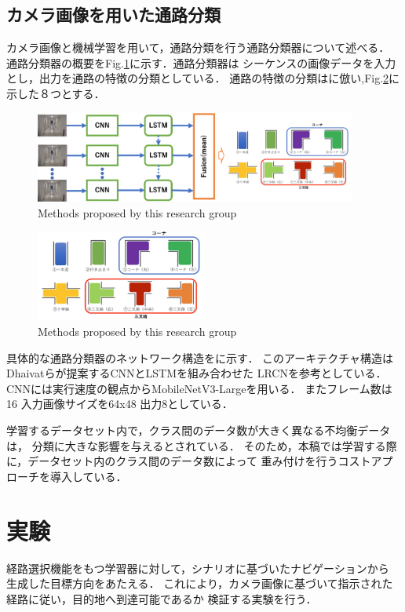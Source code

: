 \documentclass{sice-si}
\begin{document}
\subsection{カメラ画像を用いた通路分類}
カメラ画像と機械学習を用いて，通路分類を行う通路分類器について述べる．
通路分類器の概要をFig.\ref{fig:lrcn}に示す．通路分類器は
シーケンスの画像データを入力とし，出力を通路の特徴の分類としている．
通路の特徴の分類は\cite{shimada2020}に倣い,Fig.\ref{fig:intersection}に示した８つとする．
\begin{figure}[h!]
    \centering
     \includegraphics[height=30mm]{./figs/LRCN.png}
     \caption{Methods proposed by this research group}\label{fig:lrcn}
\end{figure}
\begin{figure}[h!]
    \centering
     \includegraphics[height=30mm]{./figs/intersection.png}
     \caption{Methods proposed by this research group}\label{fig:intersection}
\end{figure}
\par
具体的な通路分類器のネットワーク構造をに示す．
このアーキテクチャ構造はDhaivatらが提案するCNNとLSTMを組み合わせた
LRCN\cite{lrcn}を参考としている．
CNNには実行速度の観点からMobileNetV3-Large\cite{v3}を用いる．
またフレーム数は16 入力画像サイズを64x48 出力8としている．
\par
学習するデータセット内で，クラス間のデータ数が大きく異なる不均衡データは，
分類に大きな影響を与える\cite{hukin}とされている．
そのため，本稿では学習する際に，データセット内のクラス間のデータ数によって
重み付けを行うコストアプローチ\cite{cost}を導入している．

\section{実験}
経路選択機能をもつ学習器に対して，シナリオに基づいたナビゲーションから
生成した目標方向をあたえる．
これにより，カメラ画像に基づいて指示された経路に従い，目的地へ到達可能であるか
検証する実験を行う．
\end{document}
